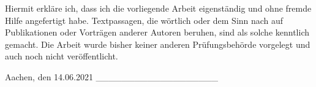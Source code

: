 Hiermit erkläre ich, dass ich die vorliegende Arbeit eigenständig und
ohne fremde Hilfe angefertigt habe. Textpassagen, die wörtlich oder dem
Sinn nach auf Publikationen oder Vorträgen anderer Autoren beruhen, sind
als solche kenntlich gemacht. Die Arbeit wurde bisher keiner anderen
Prüfungsbehörde vorgelegt und auch noch nicht veröffentlicht.

Aachen, den 14.06.2021 \_\_\_\_\_\_\_\_\_\_\_\_\_\_\_\_\_\_\_
